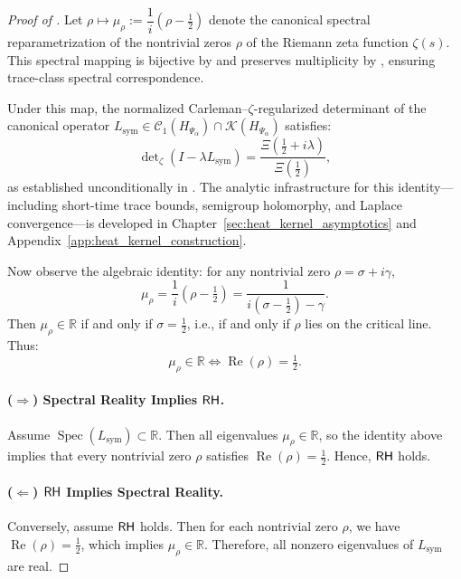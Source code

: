 \begin{proof}[Proof of ]
Let \( \rho \mapsto \mu_\rho := \dfrac{1}{i}(\rho - \tfrac{1}{2}) \) denote the canonical spectral reparametrization of the nontrivial zeros \( \rho \) of the Riemann zeta function \( \zeta(s) \). This spectral mapping is bijective by  and preserves multiplicity by , ensuring trace-class spectral correspondence.

\medskip

Under this map, the normalized Carleman–\(\zeta\)-regularized determinant of the canonical operator \( L_{\mathrm{sym}} \in \mathcal{C}_1(H_{\Psi_\alpha}) \cap \mathcal{K}(H_{\Psi_\alpha}) \) satisfies:
\[
\det\nolimits_\zeta(I - \lambda L_{\mathrm{sym}}) = \frac{\Xi\left( \tfrac{1}{2} + i\lambda \right)}{\Xi\left( \tfrac{1}{2} \right)},
\]
as established unconditionally in . The analytic infrastructure for this identity—including short-time trace bounds, semigroup holomorphy, and Laplace convergence—is developed in Chapter~\ref{sec:heat_kernel_asymptotics} and Appendix~\ref{app:heat_kernel_construction}.

\medskip

Now observe the algebraic identity: for any nontrivial zero \( \rho = \sigma + i\gamma \),
\[
\mu_\rho = \frac{1}{i}(\rho - \tfrac{1}{2}) = \frac{1}{i(\sigma - \tfrac{1}{2}) - \gamma}.
\]
Then \( \mu_\rho \in \mathbb{R} \) if and only if \( \sigma = \tfrac{1}{2} \), i.e., if and only if \( \rho \) lies on the critical line. Thus:
\[
\mu_\rho \in \mathbb{R} \iff \operatorname{Re}(\rho) = \tfrac{1}{2}.
\]

\paragraph*{(\( \Rightarrow \)) Spectral Reality Implies \(\mathsf{RH}\).}
Assume \( \operatorname{Spec}(L_{\mathrm{sym}}) \subset \mathbb{R} \). Then all eigenvalues \( \mu_\rho \in \mathbb{R} \), so the identity above implies that every nontrivial zero \( \rho \) satisfies \( \operatorname{Re}(\rho) = \tfrac{1}{2} \). Hence, \(\mathsf{RH}\) holds.

\paragraph*{(\( \Leftarrow \)) \(\mathsf{RH}\) Implies Spectral Reality.}
Conversely, assume \(\mathsf{RH}\) holds. Then for each nontrivial zero \( \rho \), we have \( \operatorname{Re}(\rho) = \tfrac{1}{2} \), which implies \( \mu_\rho \in \mathbb{R} \). Therefore, all nonzero eigenvalues of \( L_{\mathrm{sym}} \) are real.


\end{proof}
